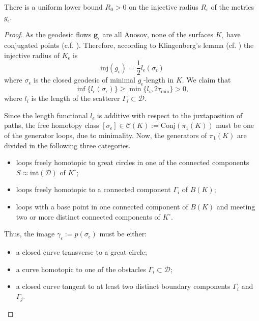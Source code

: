 \documentclass[reqno,11pt]{amsart}
\begin{document}
\begin{lemma}\label{lem:uniform_lower_bound_inj_radius}
    There is a uniform lower bound \( R_0 > 0 \) on the injective radius \( R_\epsilon \) of the metrics \( g_\epsilon \). 
\end{lemma}
\begin{proof}
    As the geodesic flows \( \mathbf{g}_\epsilon \) are all Anosov, none of the surfaces \( K_\epsilon \) have conjugated points (c.f. \cite{klingenberg_riemannian_1974}).
    Therefore, according to Klingenberg's lemma (cf. \cite[Lemma 1.8]{AbreschMeyer1997}) the injective radius of \( K_\epsilon \) is
    \[
        \mathrm{inj}(g_\epsilon) = \frac{1}{2}l_\epsilon(\sigma_\epsilon)
    \]
    where \( \sigma_\epsilon \) is the closed geodesic of minimal \( g_\epsilon \)-length in \( K \). 
    We claim that 
    \[
        \inf \{l_\epsilon(\sigma_\epsilon)\} \geq \min\{l_i, 2\tau_\mathrm{min}\} > 0,
    \] 
    where \( l_i \) is the length of the scatterer \( \Gamma_i \subset \mathcal{D} \).
    \par Since the length functional \( l_\epsilon \) is additive with respect to the juxtaposition of paths, the free homotopy class \( [\sigma_\epsilon] \in \mathcal{C}(K) := \mathrm{Conj}(\pi_1(K)) \) must be one of the generator loops, due to minimality.
    Now, the generators of \( \pi_1(K) \) are divided in the following three categories.
    \begin{itemize}
        \item[(i)] loops freely homotopic to great circles in one of the connected components \( S \approx \mathrm{int}(\mathcal{D}) \) of \( K^\circ \);
        \item[(ii)] loops freely homotopic to a connected component \(\Gamma_i\) of \( B(K) \);
        \item[(iii)] loops with a base point in one connected component of \( B(K)\) and meeting two or more distinct connected components of \( K^\circ\). 
    \end{itemize}
    Thus, the image \( \gamma_\epsilon := p(\sigma_\epsilon) \) must be either:
    \begin{itemize}
        \item[(i)] a closed curve transverse to a great circle;
        \item[(ii)] a curve homotopic to one of the obstacles \( \Gamma_i \subset \mathcal{D} \);
        \item[(iii)] a closed curve tangent to at least two distinct boundary components \( \Gamma_i \) and \( \Gamma_j \).

\end{itemize}
\end{proof}
\end{document}
